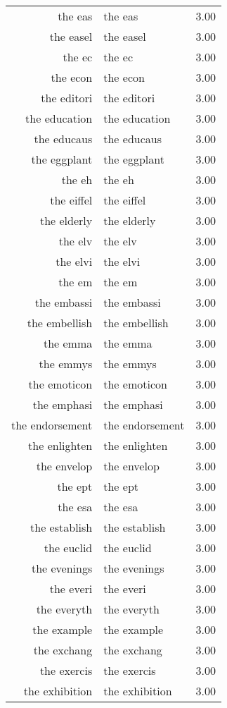 \begin{table}[ht]
\begin{tabular}{rlr}
  the eas & the eas & 3.00 \\ 
  the easel & the easel & 3.00 \\ 
  the ec & the ec & 3.00 \\ 
  the econ & the econ & 3.00 \\ 
  the editori & the editori & 3.00 \\ 
  the education & the education & 3.00 \\ 
  the educaus & the educaus & 3.00 \\ 
  the eggplant & the eggplant & 3.00 \\ 
  the eh & the eh & 3.00 \\ 
  the eiffel & the eiffel & 3.00 \\ 
  the elderly & the elderly & 3.00 \\ 
  the elv & the elv & 3.00 \\ 
  the elvi & the elvi & 3.00 \\ 
  the em & the em & 3.00 \\ 
  the embassi & the embassi & 3.00 \\ 
  the embellish & the embellish & 3.00 \\ 
  the emma & the emma & 3.00 \\ 
  the emmys & the emmys & 3.00 \\ 
  the emoticon & the emoticon & 3.00 \\ 
  the emphasi & the emphasi & 3.00 \\ 
  the endorsement & the endorsement & 3.00 \\ 
  the enlighten & the enlighten & 3.00 \\ 
  the envelop & the envelop & 3.00 \\ 
  the ept & the ept & 3.00 \\ 
  the esa & the esa & 3.00 \\ 
  the establish & the establish & 3.00 \\ 
  the euclid & the euclid & 3.00 \\ 
  the evenings & the evenings & 3.00 \\ 
  the everi & the everi & 3.00 \\ 
  the everyth & the everyth & 3.00 \\ 
  the example & the example & 3.00 \\ 
  the exchang & the exchang & 3.00 \\ 
  the exercis & the exercis & 3.00 \\ 
  the exhibition & the exhibition & 3.00 \\ 

\end{tabular}
\end{table}
